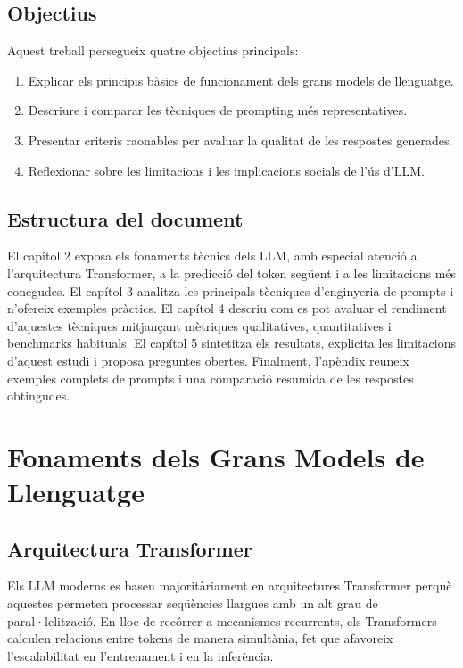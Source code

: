 \documentclass[12pt,a4paper]{report}
\begin{document}
\section{Objectius}
Aquest treball persegueix quatre objectius principals:
\begin{enumerate}[leftmargin=1.2cm]
  \item Explicar els principis bàsics de funcionament dels grans models de llenguatge.
  \item Descriure i comparar les tècniques de prompting més representatives.
  \item Presentar criteris raonables per avaluar la qualitat de les respostes generades.
  \item Reflexionar sobre les limitacions i les implicacions socials de l'ús d'LLM.
\end{enumerate}

\section{Estructura del document}
El capítol 2 exposa els fonaments tècnics dels LLM, amb especial atenció a l'arquitectura Transformer, a la predicció del token següent i a les limitacions més conegudes. El capítol 3 analitza les principals tècniques d'enginyeria de prompts i n'ofereix exemples pràctics. El capítol 4 descriu com es pot avaluar el rendiment d'aquestes tècniques mitjançant mètriques qualitatives, quantitatives i benchmarks habituals. El capítol 5 sintetitza els resultats, explicita les limitacions d'aquest estudi i proposa preguntes obertes. Finalment, l'apèndix reuneix exemples complets de prompts i una comparació resumida de les respostes obtingudes.

\chapter{Fonaments dels Grans Models de Llenguatge}

\section{Arquitectura Transformer}
Els LLM moderns es basen majoritàriament en arquitectures Transformer perquè aquestes permeten processar seqüències llargues amb un alt grau de paral·lelització. En lloc de recórrer a mecanismes recurrents, els Transformers calculen relacions entre tokens de manera simultània, fet que afavoreix l'escalabilitat en l'entrenament i en la inferència.
\end{document}
